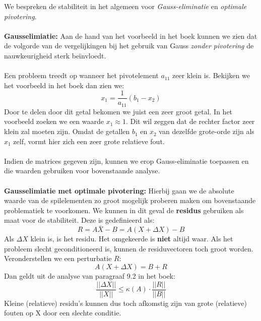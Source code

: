 We bespreken de stabiliteit in het algemeen voor \textit{Gauss-eliminatie} en \textit{optimale pivotering}. \\
\\
\textbf{Gausselimiatie:} Aan de hand van het voorbeeld in het boek kunnen we zien dat de volgorde van de vergelijkingen bij het gebruik van Gauss \textit{zonder pivotering} de nauwkeurigheid sterk be\"invloedt.\\
\\
Een probleem treedt op wanneer het pivotelement $a_{11}$ zeer klein is. Bekijken we het voorbeeld in het boek dan zien we:
\[
x_1 = \frac{1}{a_{11}}(b_1-x_2)
\]
Door te delen door dit getal bekomen we juist een zeer groot getal. In het voorbeeld zoeken we een waarde $x_1 \approx 1$. Dit wil zeggen dat de rechter factor zeer klein zal moeten zijn. Omdat de getallen $b_1$ en $x_2$ van dezelfde grote-orde zijn als $x_1$ zelf, vormt hier zich een zeer grote relatieve fout. \\
\\
Indien de matrices gegeven zijn, kunnen we erop Gauss-eliminatie toepassen en die waarden gebruiken voor bovenstaande analyse. \\
\\
\textbf{Gausselimiatie met optimale pivotering:} Hierbij gaan we de absolute waarde van de spilelementen zo groot mogelijk proberen maken om bovenstaande problematiek te voorkomen. We kunnen in dit geval de \textbf{residus} gebruiken als maat voor de stabiliteit. Deze is gedefinieerd als:
\[
R = A \bar{X}-B = A (X+ \Delta X) - B
\]
Als $\Delta X$ klein is, is het residu. Het omgekeerde is \textbf{niet} altijd waar. Als het probleem slecht geconditioneerd is, kunnen de residuvectoren toch groot worden. Veronderstellen we een perturbatie $R$:
\[
A(X+\Delta X) = B + R
\]
Dan geldt uit de analyse van paragraaf 9.2 in het boek:
\[
\frac{|| \Delta X  ||}{ || X || } \leq \kappa(A)\cdot\frac{||R||}{||B||}
\]
Kleine (relatieve) residu's kunnen dus toch afkomstig zijn van grote (relatieve) fouten op X door een slechte conditie.